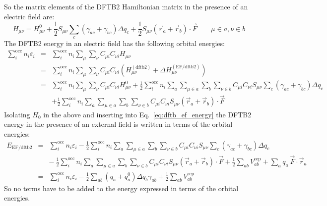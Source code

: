 \documentclass{article}
\numberwithin{equation}{section}
\begin{document}
So the matrix elements of the DFTB2 Hamiltonian matrix in the presence of an electric field  are:
\begin{equation}
    H_{\mu\nu} = H^0_{\mu\nu} + \frac{1}{2}S_{\mu\nu} \sum_c \left( \gamma_{ac} + \gamma_{bc} \right)\Delta q_c  + \frac{1}{2} S_{\mu\nu} \left( \vec{r}_a + \vec{r}_b \right) \cdot \vec{F}  \qquad \mu \in a, \nu \in b \label{eq:dftb_ef_hamil}
\end{equation}
The DFTB2 energy in an electric field has the following orbital energies:
\begin{eqnarray}
    \sum_i^\mathrm{occ} n_i \varepsilon_i 
    &=& \sum_i^\mathrm{occ} n_i \sum_{\mu} \sum_{\nu}  C_{\mu i} C_{\nu i} H_{\mu\nu}\nonumber\\
    &=& \sum_i^\mathrm{occ} n_i \sum_{\mu} \sum_{\nu}  C_{\mu i} C_{\nu i} \left(H_{\mu\nu}^{\mathrm{(dftb2)}} + \Delta H_{\mu\nu}^{\mathrm{(EF/dftb2)}} \right)\nonumber\\
    &=& \sum_i^\mathrm{occ} n_i \sum_{\mu} \sum_{\nu}  C_{\mu i} C_{\nu i} H_{\mu\nu}^0
    + \frac{1}{2} \sum_i^\mathrm{occ} n_i \sum_a \sum_{\mu \in a} \sum_b \sum_{\nu \in b}  C_{\mu i} C_{\nu i} S_{\mu\nu} \sum_c \left( \gamma_{ac} + \gamma_{bc} \right)\Delta q_c \nonumber\\
    && + \frac{1}{2} \sum_i^\mathrm{occ} n_i \sum_a \sum_{\mu \in a} \sum_b \sum_{\nu \in b}  C_{\mu i} C_{\nu i} 
    S_{\mu\nu} \left( \vec{r}_a + \vec{r}_b \right) \cdot \vec{F} \label{eq:orbital_energies_ef}
\end{eqnarray}
Isolating $H_0$ in the above and inserting into Eq.~\ref{eq:dftb_ef_energy} the DFTB2 energy in the presence of an external field is written in terms of the orbital energies:
\begin{eqnarray}
    E_\mathrm{EF/dftb2}  
    &=& \sum_i^\mathrm{occ} n_i \varepsilon_i - \frac{1}{2} \sum_i^\mathrm{occ} n_i \sum_a \sum_{\mu \in a} \sum_b \sum_{\nu \in b}  C_{\mu i} C_{\nu i} S_{\mu\nu} \sum_c \left( \gamma_{ac} + \gamma_{bc} \right)\Delta q_c \nonumber\\
    && -\ \frac{1}{2} \sum_i^\mathrm{occ} n_i \sum_a \sum_{\mu \in a} \sum_b \sum_{\nu \in b}  C_{\mu i} C_{\nu i} 
    S_{\mu\nu} \left( \vec{r}_a + \vec{r}_b \right) \cdot \vec{F}  + \frac{1}{2} \sum_{ab} V^\mathrm{rep}_{ab} + \sum_a q_a\ \vec{F} \cdot \vec{r}_a \nonumber\\
    &=& \sum_i^\mathrm{occ} n_i \varepsilon_i - \frac{1}{2}\sum_{ab} \left(q_a + q_a^0 \right)\Delta q_b \gamma_{ab} + \frac{1}{2} \sum_{ab} V^\mathrm{rep}_{ab}
\end{eqnarray}
So no terms have to be added to the energy expressed in terms of the orbital energies.
\end{document}
